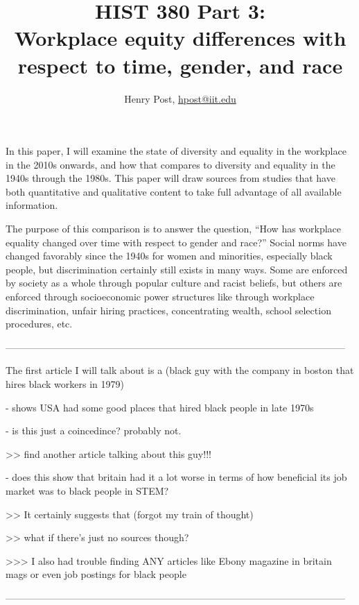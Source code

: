 \documentclass[a4paper,12pt]{article}
\title{HIST 380 Part 3: \\ Workplace equity differences with \\ respect to time, gender, and race }
\author{Henry Post, \url{hpost@iit.edu}}
\begin{document}
\maketitle

\newpage
\doublespacing


	In this paper, I will examine the state of diversity and equality in the workplace in the 2010s onwards, and how that compares to diversity and equality in the 1940s through the 1980s. 
This paper will draw sources %
from studies that have both quantitative and qualitative content to take full advantage of all available information.

	The purpose of this comparison is to answer the question, ``How has workplace equality changed over time with respect to gender and race?'' Social norms have changed favorably since the 1940s for women and minorities, especially black people, but discrimination certainly still exists in many ways. Some are enforced by society as a whole through popular culture and racist beliefs, but others are enforced through socioeconomic power structures like through workplace discrimination, unfair hiring practices, concentrating wealth, school selection procedures, etc.

---------------------------------------------------------------------------------------------------------

The first article I will talk about is a (black guy with the company in boston that hires black workers in 1979) \cite{csc}

- shows USA had some good places that hired black people in late 1970s

- is this just a coincedince? probably not.

>> find another article talking about this guy!!!

- does this show that britain had it a lot worse in terms of how beneficial its job market was to black people in STEM?

>> It certainly suggests that (forgot my train of thought)

>> what if there's just no sources though?

>>> I also had trouble finding ANY articles like Ebony magazine in britain mags or even job postings for black people

---------------------------------------------------------------------------------------------------------
\end{document}
